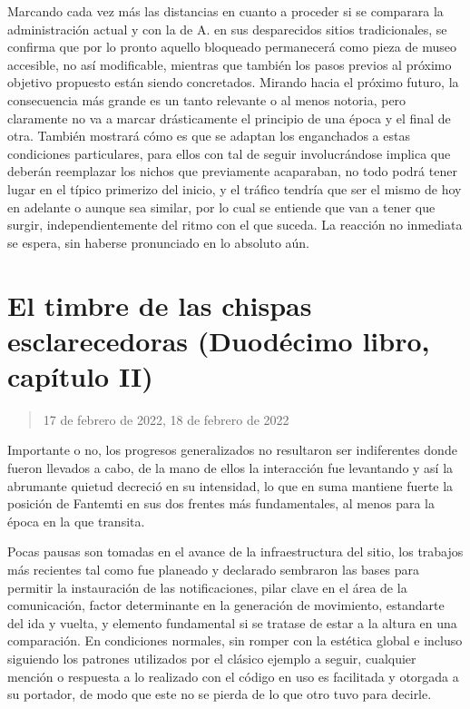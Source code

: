 \documentclass[
]{book}
\begin{document}
Marcando cada vez más las distancias en cuanto a proceder si se comparara la administración actual y con la de A. en sus desparecidos sitios tradicionales, se confirma que por lo pronto aquello bloqueado permanecerá como pieza de museo accesible, no así modificable, mientras que también los pasos previos al próximo objetivo propuesto están siendo concretados. Mirando hacia el próximo futuro, la consecuencia más grande es un tanto relevante o al menos notoria, pero claramente no va a marcar drásticamente el principio de una época y el final de otra. También mostrará cómo es que se adaptan los enganchados a estas condiciones particulares, para ellos con tal de seguir involucrándose implica que deberán reemplazar los nichos que previamente acaparaban, no todo podrá tener lugar en el típico primerizo del inicio, y el tráfico tendría que ser el mismo de hoy en adelante o aunque sea similar, por lo cual se entiende que van a tener que surgir, independientemente del ritmo con el que suceda. La reacción no inmediata se espera, sin haberse pronunciado en lo absoluto aún.

\hypertarget{el-timbre-de-las-chispas-esclarecedoras-duoduxe9cimo-libro-capuxedtulo-ii}{%
\section{El timbre de las chispas esclarecedoras (Duodécimo libro, capítulo II)}\label{el-timbre-de-las-chispas-esclarecedoras-duoduxe9cimo-libro-capuxedtulo-ii}}

\begin{quote}
17 de febrero de 2022, 18 de febrero de 2022
\end{quote}

Importante o no, los progresos generalizados no resultaron ser indiferentes donde fueron llevados a cabo, de la mano de ellos la interacción fue levantando y así la abrumante quietud decreció en su intensidad, lo que en suma mantiene fuerte la posición de Fantemti en sus dos frentes más fundamentales, al menos para la época en la que transita.

Pocas pausas son tomadas en el avance de la infraestructura del sitio, los trabajos más recientes tal como fue planeado y declarado sembraron las bases para permitir la instauración de las notificaciones, pilar clave en el área de la comunicación, factor determinante en la generación de movimiento, estandarte del ida y vuelta, y elemento fundamental si se tratase de estar a la altura en una comparación. En condiciones normales, sin romper con la estética global e incluso siguiendo los patrones utilizados por el clásico ejemplo a seguir, cualquier mención o respuesta a lo realizado con el código en uso es facilitada y otorgada a su portador, de modo que este no se pierda de lo que otro tuvo para decirle.
\end{document}
